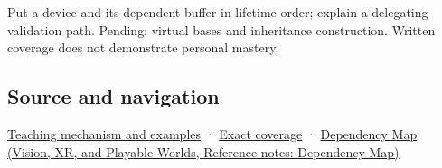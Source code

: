 Put a device and its dependent buffer in lifetime order; explain a delegating validation path. Pending: virtual bases and inheritance construction. Written coverage does not demonstrate personal mastery.

\subsection{Source and navigation}\label{appendix-3cb49709605a-source-and-navigation}

\hyperref[01-foundations-i-ch003-construction-order-records-lifetime-dependencies]{Teaching mechanism and examples} · \hyperref[appendix-fd090d982a15-m009---parts-127-147]{Exact coverage} · \href{../07-Vision-XR-and-Playable-Worlds/main.pdf\#nameddest=appendix-4ad47bdd269a}{Dependency Map (Vision, XR, and Playable Worlds, Reference notes: Dependency Map)}
